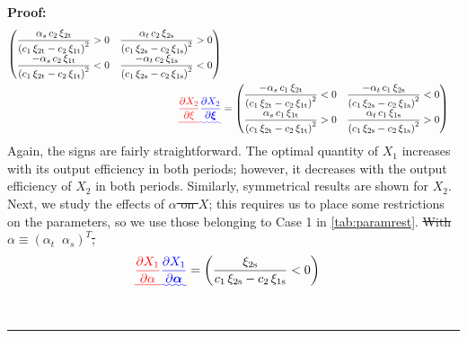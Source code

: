 \documentclass[11pt,a4paper,leqno]{extarticle}
\newenvironment{proof}[1][Proof]{\noindent\textbf{#1:} }{\ \rule{0.5em}{0.5em}}
\providecommand{\DIFadd}[1]{{\protect\color{blue}\uwave{#1}}} %
\providecommand{\DIFdel}[1]{{\protect\color{red}\sout{#1}}}                      %
\providecommand{\DIFaddbegin}{} %
\providecommand{\DIFaddend}{} %
\providecommand{\DIFdelbegin}{} %
\providecommand{\DIFdelend}{} %
\begin{document}
\begin{proof}
\begin{alignat*}{1}
	\begin{pmatrix}
	\dfrac{\alpha _{s}\,c_{2}\,\xi _{\mathrm{2t}}}{{\left(c_{1}\,\xi _{\mathrm{2t}}-c_{2}\,\xi _{\mathrm{1t}}\right)}^2}>0 & \dfrac{\alpha _{t}\,c_{2}\,\xi _{\mathrm{2s}}}{{\left(c_{1}\,\xi _{\mathrm{2s}}-c_{2}\,\xi _{\mathrm{1s}}\right)}^2}>0 \\
	\dfrac{-\alpha _{s}\,c_{2}\,\xi _{\mathrm{1t}}}{{\left(c_{1}\,\xi _{\mathrm{2t}}-c_{2}\,\xi _{\mathrm{1t}}\right)}^2}<0 & \dfrac{-\alpha _{t}\,c_{2}\,\xi _{\mathrm{1s}}}{{\left(c_{1}\,\xi _{\mathrm{2s}}-c_{2}\,\xi _{\mathrm{1s}}\right)}^2}<0 \\
	\end{pmatrix}\\
	\DIFdelbegin \DIFdel{\frac{\partial X_2}{\partial \xi} }\DIFdelend \DIFaddbegin \DIFadd{\frac{\partial X_2}{\partial \boldsymbol{\xi}} }\DIFaddend &= 
	\begin{pmatrix}
	\dfrac{-\alpha _{s}\,c_{1}\,\xi _{\mathrm{2t}}}{{\left(c_{1}\,\xi _{\mathrm{2t}}-c_{2}\,\xi _{\mathrm{1t}}\right)}^2} <0& \dfrac{-\alpha _{t}\,c_{1}\,\xi _{\mathrm{2s}}}{{\left(c_{1}\,\xi _{\mathrm{2s}}-c_{2}\,\xi _{\mathrm{1s}}\right)}^2} <0\\
	\dfrac{\alpha _{s}\,c_{1}\,\xi _{\mathrm{1t}}}{{\left(c_{1}\,\xi _{\mathrm{2t}}-c_{2}\,\xi _{\mathrm{1t}}\right)}^2}>0& \dfrac{\alpha _{t}\,c_{1}\,\xi _{\mathrm{1s}}}{{\left(c_{1}\,\xi _{\mathrm{2s}}-c_{2}\,\xi _{\mathrm{1s}}\right)}^2} >0\\
	\end{pmatrix}
	\end{alignat*}
	Again, the signs are fairly straightforward. The optimal quantity of $X_1$ increases with its output efficiency in both periods; however, it decreases with the output efficiency of $X_2$ in both periods. Similarly, symmetrical results are shown for $X_2$. Next, we study the effects of \DIFdelbegin \DIFdel{$\alpha$ on $X$}\DIFdelend \DIFaddbegin \DIFadd{$\boldsymbol{\alpha}$ on $\mathbf{X}$}\DIFaddend ; this requires us to place some restrictions on the parameters, so we use those belonging to Case 1 in \autoref{tab:paramrest}. \DIFdelbegin \DIFdel{With $\alpha \equiv \left( \alpha_t \;\; \alpha_s \right)^T$, }\DIFdelend \DIFaddbegin \DIFadd{Then, we have 
	}\DIFaddend \begin{align*}
	\DIFdelbegin \DIFdel{\frac{\partial X_1}{\partial \alpha} }\DIFdelend \DIFaddbegin \DIFadd{\frac{\partial X_1}{\partial \boldsymbol{\alpha}} }\DIFaddend &= 
	\begin{pmatrix}
	\dfrac{\xi _{\mathrm{2s}}}{c_{1}\,\xi _{\mathrm{2s}}-c_{2}\,\xi _{\mathrm{1s}}}<0 \\

\end{pmatrix}
\end{align*}
\end{proof}
\end{document}
